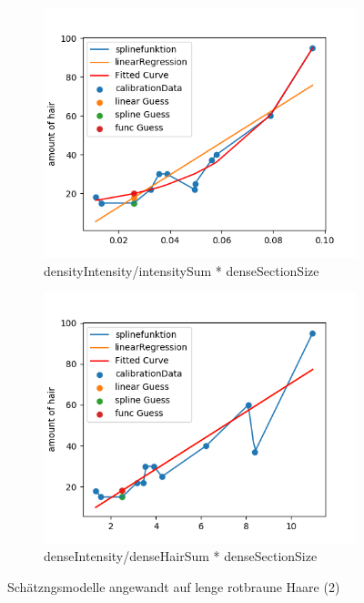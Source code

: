 \documentclass[german,a4paper, 12pt]{llncs}
\begin{document}
\begin{figure}[H]
	\medskip
	\begin{subfigure}{0.48\textwidth}
		\includegraphics[width=1.15\linewidth]{fig64/g11_denseIntensitynorm.png}
		\caption{densityIntensity/intensitySum * denseSectionSize} \label{fig:e}
	\end{subfigure}\hspace*{\fill}
	\begin{subfigure}{0.48\textwidth}
		\includegraphics[width=1.15\linewidth]{fig64/g12_denseIntensitynorm2.png}
		\caption{denseIntensity/denseHairSum * denseSectionSize} \label{fig:f}
	\end{subfigure}
	
	
	\caption{Schätzngsmodelle angewandt auf lenge rotbraune Haare (2)} \label{fig:1}
\end{figure}
\end{document}
